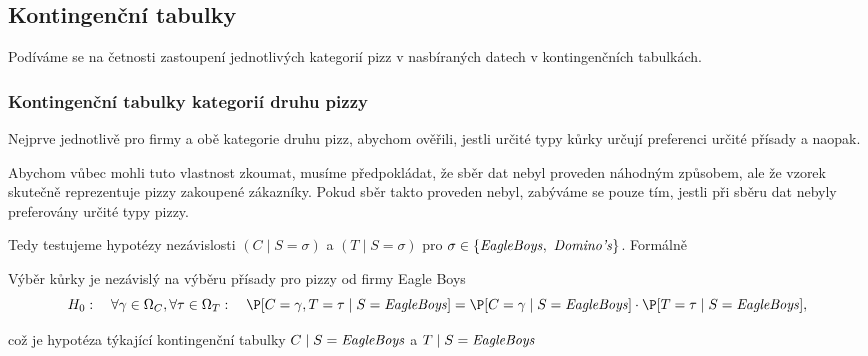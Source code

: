 \subsection{Kontingenční tabulky}%
\label{sub:kontingencni_tabulky}
Podíváme se na četnosti zastoupení jednotlivých kategorií pizz v nasbíraných datech v kontingenčních tabulkách.

\subsubsection{Kontingenční tabulky kategorií druhu pizzy}%
\label{ssub:kontingencní_tabulky_kategorii_druhu_pizzy}

Nejprve jednotlivě pro firmy a obě kategorie druhu pizz, abychom ověřili, jestli určité typy kůrky
určují preferenci určité přísady a naopak.
\begin{note}
	Abychom vůbec mohli tuto vlastnost zkoumat, musíme předpokládat, že sběr dat nebyl proveden
	náhodným způsobem, ale že vzorek skutečně reprezentuje pizzy zakoupené zákazníky. Pokud sběr
	takto proveden nebyl, zabýváme se pouze tím, jestli při sběru dat nebyly preferovány určité typy
	pizzy.
\end{note}
\noindent Tedy testujeme hypotézy nezávislosti $\left( C \mid S =
	\sigma \right)$ a $\left( T \mid S = \sigma \right)$ pro $\sigma \in \left\{ \text{\emph{EagleBoys}}, \text{ \emph{Domino's}} \right\} $. Formálně

\begin{hypothesis}
	\label{hyp:nezavislost_kategorii_eagle}
	Výběr kůrky je nezávislý na výběru přísady pro pizzy od firmy Eagle Boys
	\[
		H_0: \quad \forall \gamma \in \Omega_C, \forall \tau \in \Omega_T: \quad \P[C = \gamma,T =
			\tau \mid S = \text{\emph{EagleBoys}}] = \P[C = \gamma \mid S = \text{\emph{EagleBoys}}]
		\cdot \P[T = \tau \mid S = \text{\emph{EagleBoys}}],
	\]
\end{hypothesis}

\noindent což je hypotéza týkající kontingenční tabulky \(C \mid S = \text{\emph{EagleBoys}}\) a \(T \mid S =
\text{\emph{EagleBoys}}\)

